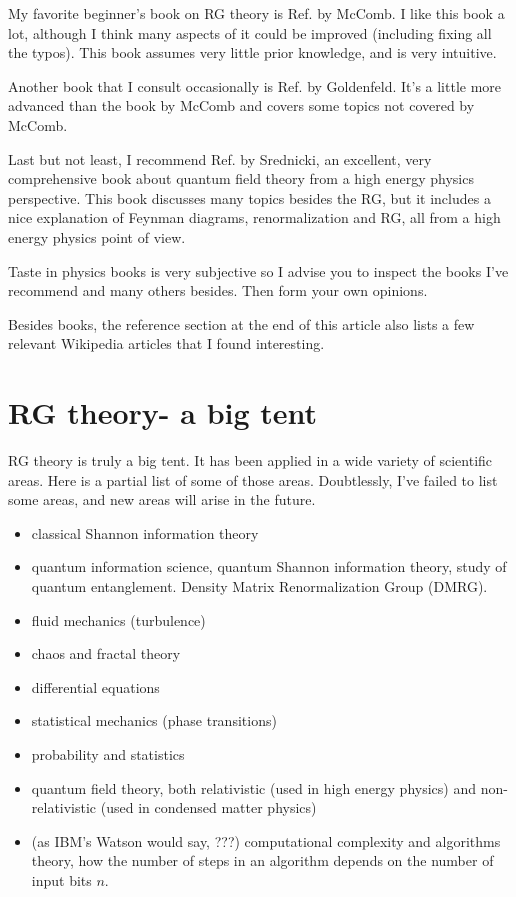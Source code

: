 \documentclass[12pt]{article}
\begin{document}
My favorite beginner's book on
RG theory is
Ref.\cite{Mc} by McComb.
I like this book a lot,
although I think many aspects of it
could be improved (including
fixing all the typos). This book assumes
very little prior knowledge,
and is very intuitive.

Another book
that I consult occasionally
is Ref.\cite{Go} by Goldenfeld. It's
 a little more advanced
than the book by McComb
and covers some topics not
covered by McComb.

Last but not least,
I recommend Ref.\cite{Sr}
by Srednicki,
an excellent, very comprehensive
 book about
quantum field theory from
a high energy
physics perspective.
This book discusses many topics
besides the RG, but it
includes a nice
explanation of
Feynman diagrams,
renormalization and RG,
all from a high energy
physics point of view.


Taste in physics books is very subjective so
I advise you to inspect the books
I've recommend
and many others besides. Then
form your own opinions.

Besides books, the reference section
at the end of this article also
lists
a few relevant Wikipedia
articles that I found interesting.


\section{RG theory- a big tent}

RG theory is
truly a big tent.
It has been applied in
a wide variety of scientific areas.
Here is a partial list of some of
those areas. Doubtlessly, I've
failed to list
some areas, and new areas
will arise in the future.

\begin{itemize}
\item classical Shannon information theory
\item quantum information science, quantum
Shannon information theory,
study of quantum entanglement.
Density Matrix Renormalization Group (DMRG).
\item
fluid mechanics (turbulence)
\item
chaos and fractal theory
\item
differential equations
\item
statistical mechanics (phase transitions)
\item
probability and statistics
\item
quantum field theory,
both relativistic (used
in high energy physics) and
non-relativistic (used in condensed matter
physics)
\item (as IBM's Watson would say, ???)
computational complexity and algorithms theory,
how the number of
steps in an algorithm depends
on the number of
input bits $n$.
\end{itemize}
\end{document}
